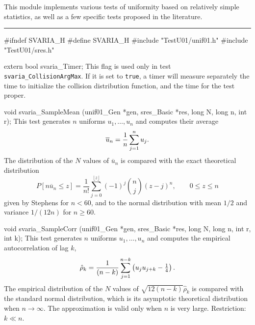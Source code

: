 
This module implements various tests of uniformity based on
relatively simple statistics, as well as a few specific tests proposed
in the literature. \resdef


\bigskip
\hrule
\code\hide
#ifndef SVARIA_H
#define SVARIA_H
\endhide
#include "TestU01/unif01.h"
#include "TestU01/sres.h"
\endcode

\ifdetailed  %
\code


extern bool svaria_Timer;
\endcode
 \tab
   This flag is used only in test  {\tt svaria\_CollisionArgMax}.
   If it is set to {\tt true}, a timer will measure separately the time to
   initialize the collision distribution function, and the time for the
   test proper.
 \endtab

\fi   %


\code

void svaria_SampleMean (unif01_Gen *gen, sres_Basic *res,
                        long N, long n, int r);
\endcode
 \tab
   This test generates $n$ uniforms $u_1,\dots,u_n$ and computes
   their average
    $$ \overline u_n = {1\over n} \sum_{j=1}^n u_j.$$
   The distribution of the $N$ values of $\overline u_n$ is compared
   with the exact theoretical distribution
$$
   P[n \overline u_n \le z] = \frac 1 {n!}
      \sum_{j = 0}^{\lfloor z \rfloor} (-1)^j {n \choose j} (z - j)^n,
     \qquad 0 \le z \le n
$$
   given by Stephens \cite{tSTE66a}
   for $n < 60$, and to the normal distribution with mean $1/2$
   and variance $1/(12n)$ for $n\ge 60$.
 \endtab
\code


void svaria_SampleCorr (unif01_Gen *gen, sres_Basic *res,
                        long N, long n, int r, int k);
\endcode
 \tab
  This test generates $n$ uniforms $u_1,\dots,u_n$ and
   computes 
  the empirical autocorrelation \cite{sFIS78a} of lag $k$,
    $$
     \hat\rho_k = {1 \over (n-k)} \sum_{j=1}^{n-k}
               \left(u_j u_{j+k} - {\textstyle \frac14}\right).
    $$
   The empirical distribution
   of the $N$ values of $\sqrt{12 (n-k)} \hat\rho_k$
   is compared with the standard normal distribution,
   which is its asymptotic theoretical distribution when $n \to\infty$.
   The approximation is valid only when $n$ is very large.
   Restriction: $k \ll n$.
 \endtab
\code


